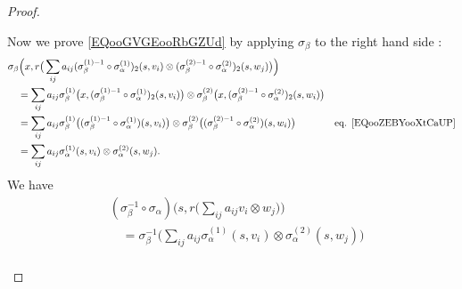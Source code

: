\begin{proof}
\begin{subproof}
\begin{subproof}
			Now we prove \eqref{EQooGVGEooRbGZUd} by applying \( \sigma_{\beta}\) to the right hand side :
			\begin{subequations}
				\begin{align}
					                                                                                            & \sigma_{\beta}  \Big( x,r\big( \sum_{ij}a_{ij}(\sigma_{\beta}^{(1)-1}\circ \sigma_{\alpha}^{(1)})_2(s,v_i)
					\otimes
					(\sigma_{\beta}^{(2)-1}\circ\sigma_{\alpha}^{(2)})_2(s,w_j)
					\big) \Big)                                                                                                                                                                                              \\
					                                                                                            & \quad  = \sum_{ij}a_{ij}
					\sigma_{\beta}^{(1)}\big( x,  (\sigma_{\beta}^{(1)-1}\circ\sigma_{\alpha}^{(1)})_2(s,v_i) \big)
					\otimes
					\sigma_{\beta}^{(2)}\big( x,  (\sigma_{\beta}^{(2)-1}\circ\sigma_{\alpha}^{(2)})_2(s,w_i) \big)                                                                                                          \\
					                                                                                            & \quad  = \sum_{ij}a_{ij}
					\sigma_{\beta}^{(1)}\big(   (\sigma_{\beta}^{(1)-1}\circ\sigma_{\alpha}^{(1)})(s,v_i) \big)
					\otimes
					\sigma_{\beta}^{(2)}\big(   (\sigma_{\beta}^{(2)-1}\circ\sigma_{\alpha}^{(2)})(s,w_i) \big) & \text{eq. \eqref{EQooZEBYooXtCaUP}}                                                                        \\
					                                                                                            & \quad = \sum_{ij}a_{ij}\sigma_{\alpha}^{(1)}(s,v_i)\otimes \sigma_{\alpha}^{(2)}(s,w_j).
				\end{align}
			\end{subequations}
			\spitem[Conclusion]
			We have
			\begin{subequations}		\label{SUBEQSooRYKSooBkBmaF}
				\begin{align}
					 & (\sigma_{\beta}^{-1}\circ\sigma_{\alpha})\Big( s,r\big( \sum_{ij}a_{ij}v_i\otimes w_j \big) \Big)                                                                                                                               \\
					 & \quad =\sigma_{\beta}^{-1}\Big( \sum_{ij}a_{ij}   \sigma_{\alpha}^{(1)}(s,v_i)\otimes \sigma_{\alpha}^{(2)}(s,w_j)  \Big)                                                                                                       \\

\end{align}
\end{subequations}
\end{subproof}
\end{subproof}
\end{proof}
